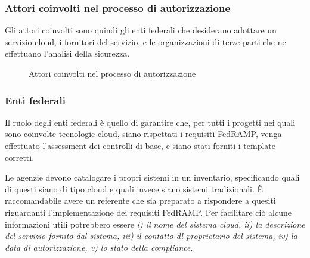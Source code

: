 \documentclass[../main.tex]{subfiles}
\begin{document}
\vfill
\subsubsection{Attori coinvolti nel processo di autorizzazione}
Gli attori coinvolti sono quindi gli enti federali che desiderano adottare un servizio cloud, i fornitori del servizio, e le organizzazioni di terze parti che ne effettuano l'analisi della sicurezza.

\begin{figure}[H]
\centering
{}
\caption{Attori coinvolti nel processo di autorizzazione \cite{understandingFedRAMP} }\label{fig:fedrampactors}
\end{figure}



\subsubsection{Enti federali}
Il ruolo degli enti federali è quello di garantire che, per tutti i progetti nei quali sono coinvolte tecnologie cloud, siano rispettati i requisiti FedRAMP, venga effettuato l'assessment dei controlli di base, e siano stati forniti i template corretti.


Le agenzie devono catalogare i propri sistemi in un inventario, specificando quali di questi siano di tipo cloud e quali invece siano sistemi tradizionali. È raccomandabile avere un referente che sia preparato a rispondere a quesiti riguardanti l'implementazione dei requisiti FedRAMP.
Per facilitare ciò alcune informazioni utili potrebbero essere \textit{i) il nome del sistema cloud, ii) la descrizione del servizio fornito dal sistema, iii) il contatto dl proprietario del sistema, iv) la data di autorizzazione, v) lo stato della compliance}\cite{fedrampFramework}.
\end{document}
